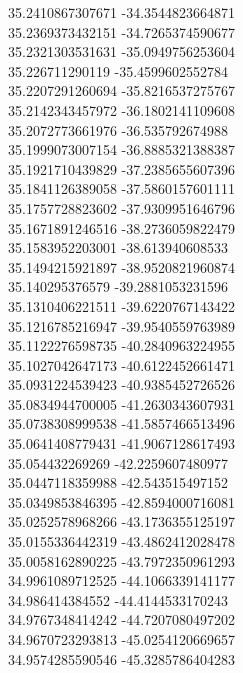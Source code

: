 {35.2410867307671	-34.3544823664871\\
35.2369373432151	-34.7265374590677\\
35.2321303531631	-35.0949756253604\\
35.226711290119	-35.4599602552784\\
35.2207291260694	-35.8216537275767\\
35.2142343457972	-36.1802141109608\\
35.2072773661976	-36.535792674988\\
35.1999073007154	-36.8885321388387\\
35.1921710439829	-37.2385655607396\\
35.1841126389058	-37.5860157601111\\
35.1757728823602	-37.9309951646796\\
35.1671891246516	-38.2736059822479\\
35.1583952203001	-38.613940608533\\
35.1494215921897	-38.9520821960874\\
35.140295376579	-39.2881053231596\\
35.1310406221511	-39.6220767143422\\
35.1216785216947	-39.9540559763989\\
35.1122276598735	-40.2840963224955\\
35.1027042647173	-40.6122452661471\\
35.0931224539423	-40.9385452726526\\
35.0834944700005	-41.2630343607931\\
35.0738308999538	-41.5857466513496\\
35.0641408779431	-41.9067128617493\\
35.054432269269	-42.2259607480977\\
35.0447118359988	-42.543515497152\\
35.0349853846395	-42.8594000716081\\
35.0252578968266	-43.1736355125197\\
35.0155336442319	-43.4862412028478\\
35.0058162890225	-43.7972350961293\\
34.9961089712525	-44.1066339141177\\
34.986414384552	-44.4144533170243\\
34.9767348414242	-44.7207080497202\\
34.9670723293813	-45.0254120669657\\
34.9574285590546	-45.3285786404283\\
}
